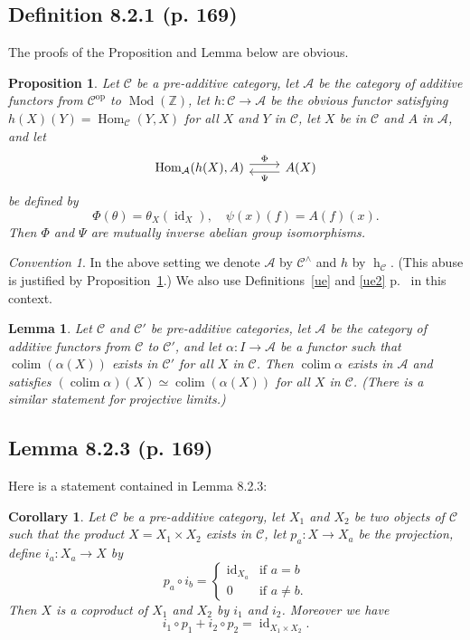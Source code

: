 \documentclass[12pt]{article}
\newtheorem{lem}[thm]{Lemma}
\newtheorem{prop}[thm]{Proposition}
\newtheorem{cor}[thm]{Corollary}
\theoremstyle{remark}
\newtheorem{conv}[thm]{Convention}
\theoremstyle{definition}
\newcommand{\bb}{\mathbb}
\newcommand{\A}{\mathcal A}
\newcommand{\C}{\mathcal C}
\DeclareMathOperator*{\co}{colim}
\DeclareMathOperator{\hy}{h}
\DeclareMathOperator{\id}{id}
\DeclareMathOperator{\Hom}{Hom}%
\DeclareMathOperator{\Mod}{Mod}
\DeclareMathOperator{\op}{op}
\begin{document}
\subsection{Definition 8.2.1 (p. 169)}
%
The proofs of the Proposition and Lemma below are obvious. 
\begin{prop}\label{payp}
Let $\C$ be a pre-additive category, let $\A$ be the category of additive functors from $\C^{\op}$ to $\Mod(\bb Z)$, let $h:\C\to\A$ be the obvious functor satisfying $h(X)(Y)=\Hom_\C(Y,X)$ for all $X$ and $Y$ in $\C$, let $X$ be in $\C$ and $A$ in $\A$, and let 
$$
\begin{tikzcd}
\Hom_\A(h(X),A)\ar[yshift=.7ex]{r}{\Phi}&A(X)\ar[yshift=-.7ex]{l}{\Psi}
\end{tikzcd}
$$
be defined by 
$$
\Phi(\theta)=\theta_X(\id_X),\quad\psi(x)(f)=A(f)(x).
$$
Then $\Phi$ and $\Psi$ are mutually inverse abelian group isomorphisms.
\end{prop}
\begin{conv}\label{payc}
In the above setting we denote $\A$ by $\C^\wedge$ and $h$ by $\hy_\C$. (This abuse is justified by Proposition~\ref{payp}.) We also use Definitions~\ref{ue} and \ref{ue2} p.~\pageref{ue} in this context.
\end{conv} 
\begin{lem}\label{payl}
Let $\C$ and $\C'$ be pre-additive categories, let $\A$ be the category of additive functors from $\C$ to $\C'$, and let $\alpha:I\to\A$ be a functor such that $\co(\alpha(X))$ exists in $\C'$ for all $X$ in $\C$. Then $\co\alpha$ exists in $\A$ and satisfies $(\co\alpha)(X)\simeq\co(\alpha(X))$ for all $X$ in $\C$. (There is a similar statement for projective limits.)
\end{lem}
%
%
\subsection{Lemma 8.2.3 (p. 169)}
%
Here is a statement contained in Lemma 8.2.3:
%
\begin{cor}\label{823}
Let $\C$ be a pre-additive category, let $X_1$ and $X_2$ be two objects of $\C$ such that the product $X=X_1\times X_2$ exists in $\C$, let $p_a:X\to X_a$ be the projection, define $i_a:X_a\to X$ by 
$$
p_a\circ i_b=\begin{cases}\id_{X_a}&\text{if }a=b\\0&\text{if }a\not=b.\end{cases}
$$ 
Then $X$ is a coproduct of $X_1$ and $X_2$ by $i_1$ and $i_2$. Moreover we have 
$$
i_1\circ p_1+i_2\circ p_2=\id_{X_1\times X_2}.
$$
\end{cor}
\end{document}
